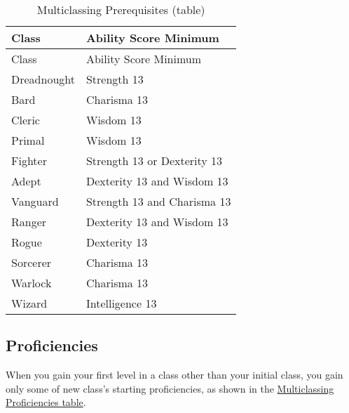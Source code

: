 \begin{longtable}[]{@{}
  >{\raggedright\arraybackslash}p{}
  >{\raggedright\arraybackslash}p{}@{}}
\caption{Multiclassing Prerequisites
(table)}\label{multiclassing-prerequisites-table}\tabularnewline
\toprule\noalign{}
\begin{minipage}[b]{\linewidth}\raggedright
Class
\end{minipage} & \begin{minipage}[b]{\linewidth}\raggedright
Ability Score Minimum
\end{minipage} \\
\midrule\noalign{}
\endfirsthead
\toprule\noalign{}
\begin{minipage}[b]{\linewidth}\raggedright
Class
\end{minipage} & \begin{minipage}[b]{\linewidth}\raggedright
Ability Score Minimum
\end{minipage} \\
\midrule\noalign{}
\endhead
\bottomrule\noalign{}
\endlastfoot
Dreadnought & Strength 13 \\
Bard & Charisma 13 \\
Cleric & Wisdom 13 \\
Primal & Wisdom 13 \\
Fighter & Strength 13 or Dexterity 13 \\
Adept & Dexterity 13 and Wisdom 13 \\
Vanguard & Strength 13 and Charisma 13 \\
Ranger & Dexterity 13 and Wisdom 13 \\
Rogue & Dexterity 13 \\
Sorcerer & Charisma 13 \\
Warlock & Charisma 13 \\
Wizard & Intelligence 13 \\
\end{longtable}

\subsection{Proficiencies}\label{_proficiencies_4}

When you gain your first level in a class other than your initial class,
you gain only some of new class's starting proficiencies, as shown in
the \hyperref[multiclassing-proficiencies-table]{Multiclassing
Proficiencies table}.

